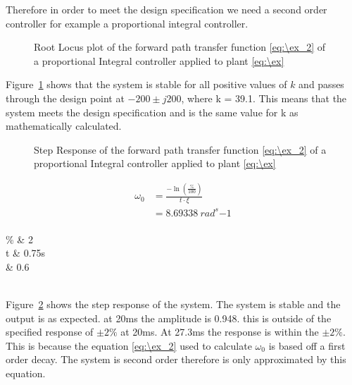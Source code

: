 Therefore in order to meet the design specification we need a second order controller for example a proportional integral controller.


\begin{figure}[ht!]
	\centering
	
	\caption{Root Locus plot of the forward path transfer function \eqref{eq:\ex_2} of a proportional Integral controller applied to plant \eqref{eq:\ex} \appendixamble{\ex}}
	\label{fig:\ex_1}
\end{figure}\FloatBarrier

Figure~\ref{fig:\ex_1} shows that the system is stable for all positive values of $k$ and passes through the design point at $-200 \pm j200$, where k = 39.1. This means that the system meets the design specification and is the same value for k as mathematically calculated.

\begin{figure}[ht!]
	\centering
	
	\caption{Step Response of the forward path transfer function \eqref{eq:\ex_2} of a proportional Integral controller applied to plant \eqref{eq:\ex} \appendixamble{\ex}}
	\label{fig:\ex_2}
\end{figure}\FloatBarrier

\begin{equation}
	\begin{split}
		\omega_{0} &= \frac{-\ln(\frac{\%}{100})}{t\cdot\xi}\\
		&=8.69338\ rad^s{-1}\\
	\end{split}\label{eq:\ex_2}
\end{equation}

\begin{conditions}
	\% & 2    \\
	t & 0.75s \\
	\xi & 0.6 \\
\end{conditions}\\

Figure~\ref{fig:\ex_2} shows the step response of the system. The system is stable and the output is as expected. at 20ms the amplitude is 0.948. this is outside of the specified response of $\pm 2\%$ at 20ms. At 27.3ms the response is within the $\pm 2\%$. This is because the equation \eqref{eq:\ex_2} used to calculate $\omega_0$ is based off a first order decay. The system is second order therefore is only approximated by this equation.